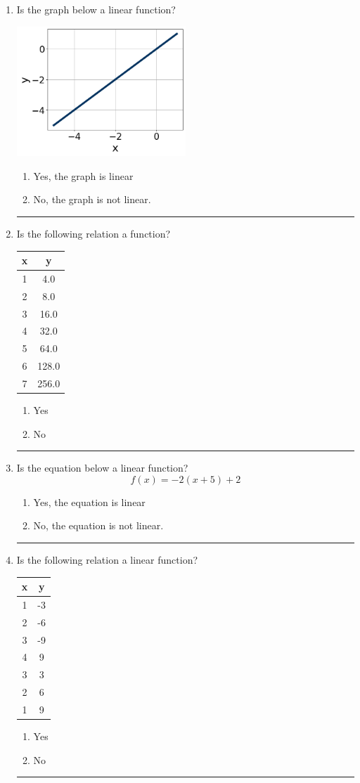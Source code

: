 \documentclass[14pt]{extbook}
\newcommand{\litem}[1]{\item#1\hspace*{-1cm}\rule{\textwidth}{0.4pt}}
\begin{document}
\begin{enumerate}
\litem{
Is the graph below a linear function?
\begin{center}
    \includegraphics[width=0.5\textwidth]{../Figures/MA_8_F_1_2_graphA.png}
\end{center}
\begin{enumerate}[label=\Alph*.]
\item Yes, the graph is linear
\item No, the graph is not linear.

\end{enumerate} }
\litem{
Is the following relation a function?

\begin{tabular}{c|c}
x &y\tabularnewline \hline
1 &4.0\tabularnewline \hline
2 &8.0\tabularnewline \hline
3 &16.0\tabularnewline \hline
4 &32.0\tabularnewline \hline
5 &64.0\tabularnewline \hline
6 &128.0\tabularnewline \hline
7 &256.0\end{tabular}\begin{enumerate}[label=\Alph*.]
\item Yes
\item No

\end{enumerate} }
\litem{
Is the equation below a linear function?\[ f(x) = -2(x + 5)+2 \]\begin{enumerate}[label=\Alph*.]
\item Yes, the equation is linear
\item No, the equation is not linear.

\end{enumerate} }
\litem{
Is the following relation a linear function?

\begin{tabular}{c|c}
x &y\tabularnewline \hline
1 &-3\tabularnewline \hline
2 &-6\tabularnewline \hline
3 &-9\tabularnewline \hline
4 &9\tabularnewline \hline
3 &3\tabularnewline \hline
2 &6\tabularnewline \hline
1 &9\end{tabular}\begin{enumerate}[label=\Alph*.]
\item Yes
\item No

\end{enumerate} }
\end{enumerate}
\end{document}

